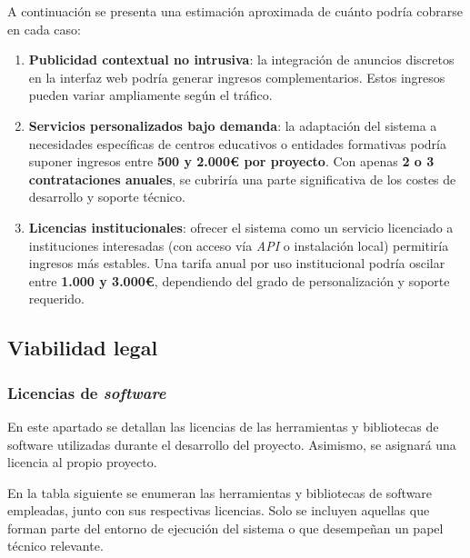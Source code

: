 A continuación se presenta una estimación aproximada de cuánto podría cobrarse en cada caso:
\begin{enumerate}
    \item \textbf{Publicidad contextual no intrusiva}: la integración de anuncios discretos en la interfaz web podría generar ingresos complementarios. Estos ingresos pueden variar ampliamente según el tráfico.
    
    \item \textbf{Servicios personalizados bajo demanda}: la adaptación del sistema a necesidades específicas de centros educativos o entidades formativas podría suponer ingresos entre \textbf{500 y 2.000€ por proyecto}. Con apenas \textbf{2 o 3 contrataciones anuales}, se cubriría una parte significativa de los costes de desarrollo y soporte técnico.
    
    \item \textbf{Licencias institucionales}: ofrecer el sistema como un servicio licenciado a instituciones interesadas (con acceso vía \textit{API} o instalación local) permitiría ingresos más estables. Una tarifa anual por uso institucional podría oscilar entre \textbf{1.000 y 3.000€}, dependiendo del grado de personalización y soporte requerido.
\end{enumerate}

\subsection{Viabilidad legal}

\subsubsection{Licencias de \textit{software}}

En este apartado se detallan las licencias de las herramientas y bibliotecas de software utilizadas durante el desarrollo del proyecto. Asimismo, se asignará una licencia al propio proyecto.

En la tabla siguiente se enumeran las herramientas y bibliotecas de software empleadas, junto con sus respectivas licencias. Solo se incluyen aquellas que forman parte del entorno de ejecución del sistema o que desempeñan un papel técnico relevante.

